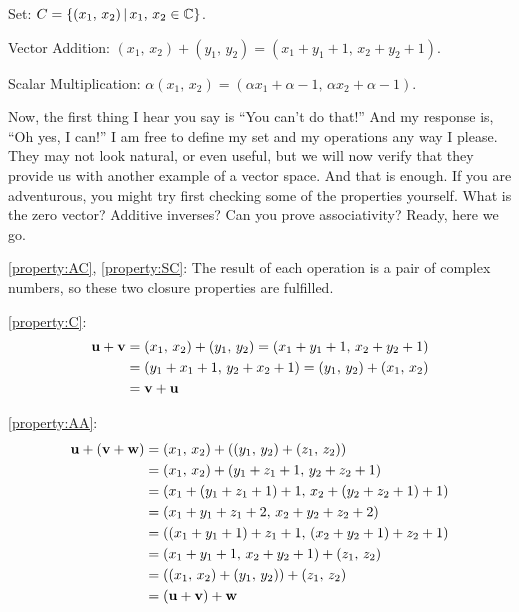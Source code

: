 \documentclass{ximera}
\begin{document}
\begin{example}

Set: $C=\left\lbrace(x_1,\,x_2)\,\middle|\,x_1,\,x_2\in\mathbb{C}\right\rbrace$.

Vector Addition:  $(x_1,\,x_2)+(y_1,\,y_2)=(x_1+y_1+1,\,x_2+y_2+1)$.

Scalar Multiplication: $\alpha(x_1,\,x_2)=(\alpha x_1+\alpha-1,\,\alpha x_2+\alpha-1)$.

Now, the first thing I hear you say is ``You can't do that!''  And my
response is, ``Oh yes, I can!''  I am free to define my set and my
operations any way I please.  They may not look natural, or even
useful, but we will now verify that they provide us with another
example of a vector space.  And that is enough.  If you are
adventurous, you might try first checking some of the properties
yourself.  What is the zero vector?  Additive inverses?  Can you prove
associativity?  Ready, here we go.

\ref{property:AC}, \ref{property:SC}:  The result of each operation is a pair of complex numbers, so these two closure properties are fulfilled.

\ref{property:C}:
\begin{align*}
  \mathbf{u}+\mathbf{v}&=(x_1,\,x_2)+(y_1,\,y_2)=(x_1+y_1+1,\,x_2+y_2+1)\\
                   &=(y_1+x_1+1,\,y_2+x_2+1)=(y_1,\,y_2)+(x_1,\,x_2)\\
                   &=\mathbf{v}+\mathbf{u}
\end{align*}

\ref{property:AA}:
\begin{align*}
  \mathbf{u}+(\mathbf{v}+\mathbf{w})&=(x_1,\,x_2)+\left((y_1,\,y_2)+(z_1,\,z_2)\right)\\
                              &=(x_1,\,x_2)+(y_1+z_1+1,\,y_2+z_2+1)\\
                              &=(x_1+(y_1+z_1+1)+1,\,x_2+(y_2+z_2+1)+1)\\
                              &=(x_1+y_1+z_1+2,\,x_2+y_2+z_2+2)\\
                              &=((x_1+y_1+1)+z_1+1,\,(x_2+y_2+1)+z_2+1)\\
                              &=(x_1+y_1+1,\,x_2+y_2+1)+(z_1,\,z_2)\\
                              &=\left((x_1,\,x_2)+(y_1,\,y_2)\right)+(z_1,\,z_2)\\
                              &=\left(\mathbf{u}+\mathbf{v}\right)+\mathbf{w}
\end{align*}


\end{example}
\end{document}
